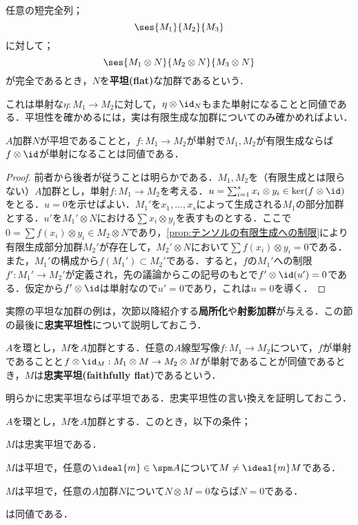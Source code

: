 \begin{defi}[平坦加群]
	任意の短完全列；
	\[\ses{M_1}{M_2}{M_3}\]
	に対して；
	\[\ses{M_1\otimes N}{M_2\otimes N}{M_3\otimes N}\]
	が完全であるとき，$N$を\textbf{平坦(flat)}な加群であるという．
\end{defi}

これは単射な$\eta:M_1\to M_2$に対して，$\eta\otimes\id_{N}$もまた単射になることと同値である．平坦性を確かめるには，実は有限生成な加群についてのみ確かめればよい．

\begin{prop}\label{prop:平坦性は有限生成を調べればよい}
	$A$加群$N$が平坦であることと，$f:M_1\to M_2$が単射で$M_1,M_2$が有限生成ならば$f\otimes\id$が単射になることは同値である．
\end{prop}

\begin{proof}
	前者から後者が従うことは明らかである．$M_1,M_2$を（有限生成とは限らない）$A$加群とし，単射$f:M_1\to M_2$を考える．$u=\sum_{i=1}^s x_i\otimes y_i\in\ker(f\otimes\id)$をとる．$u=0$を示せばよい．$M_1'$を$x_1,\dots,x_s$によって生成される$M_1$の部分加群とする．$u'$を$M_1'\otimes N$における$\sum x_i\otimes y_i$を表すものとする．ここで$0=\sum f(x_i)\otimes y_i\in M_2\otimes N$であり，\ref{prop:テンソルの有限生成への制限}により有限生成部分加群$M_2'$が存在して，$M_2'\otimes N$において$\sum f(x_i)\otimes y_i=0$である．また，$M_1'$の構成から$f(M_1')\subset M_2'$である．すると，$f$の$M_1'$への制限$f':M_1'\to M_2'$が定義され，先の議論からこの記号のもとで$f'\otimes\id(u')=0$である．仮定から$f'\otimes\id$は単射なので$u'=0$であり，これは$u=0$を導く．
\end{proof}

実際の平坦な加群の例は，次節以降紹介する\textbf{局所化}や\textbf{射影加群}が与える．この節の最後に\textbf{忠実平坦性}について説明しておこう．

\begin{defi}[忠実平坦]
	$A$を環とし，$M$を$A$加群とする．任意の$A$線型写像$f:M_1\to M_2$について，$f$が単射であることと$f\otimes\id_M:M_1\otimes M\to M_2\otimes M$が単射であることが同値であるとき，$M$は\textbf{忠実平坦(faithfully flat)}であるという．
\end{defi}

明らかに忠実平坦ならば平坦である．忠実平坦性の言い換えを証明しておこう．

\begin{prop}\label{prop:忠実平坦の言い換え}
	$A$を環とし，$M$を$A$加群とする．このとき，以下の条件；
	\begin{sakura}
		\item $M$は忠実平坦である．
		\item $M$は平坦で，任意の$\ideal{m}\in\spm A$について$M\neq \ideal{m}M$である．
		\item $M$は平坦で，任意の$A$加群$N$について$N\otimes M=0$ならば$N=0$である．
	\end{sakura}
	は同値である．
\end{prop}

